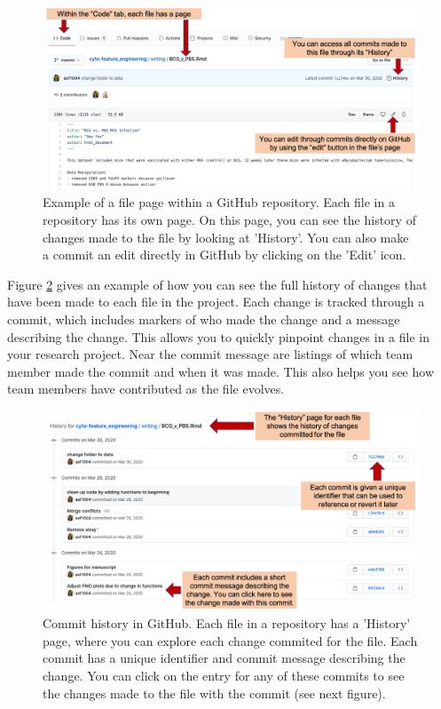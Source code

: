 \documentclass[]{tufte-book}
\begin{document}
\begin{figure}
\includegraphics[width=\textwidth]{figures/github_commits1} \caption[Example of a file page within a GitHub repository]{Example of a file page within a GitHub repository. Each file in a repository has its own page. On this page, you can see the history of changes made to the file by looking at 'History'. You can also make a commit an edit directly in GitHub by clicking on the 'Edit' icon.}\label{fig:githubcommits1}
\end{figure}

Figure \ref{fig:githubcommithistory} gives an example of how you can see the
full history of changes that have been made to each file in the project. Each
change is tracked through a commit, which includes markers of who made the
change and a message describing the change. This allows you to quickly pinpoint
changes in a file in your research project. Near the commit message are listings
of which team member made the commit and when it was made. This also helps you
see how team members have contributed as the file evolves.

\begin{figure}
\includegraphics[width=\textwidth]{figures/github_commit_history} \caption[Commit history in GitHub]{Commit history in GitHub. Each file in a repository has a 'History' page, where you can explore each change commited for the file. Each commit has a unique identifier and commit message describing the change. You can click on the entry for any of these commits to see the changes made to the file with the commit (see next figure).}\label{fig:githubcommithistory}
\end{figure}
\end{document}
